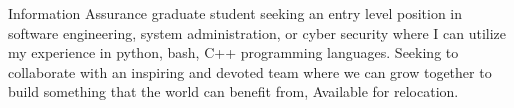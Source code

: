 

\begin{cvparagraph}

Information Assurance graduate student seeking an entry level position in software engineering, system administration, or cyber security where I can utilize my experience in python, bash, C++ programming languages. Seeking to collaborate with an inspiring and devoted team where we can grow together to build something that the world can benefit from, Available for relocation.

\end{cvparagraph}

